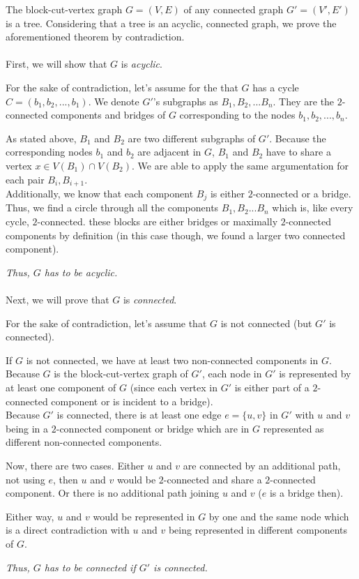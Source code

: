 \documentclass[a4paper]{article}
\begin{document}
	\begin{solution}{15}
	\begin{theorem}{The block-cut-vertex graph $G=(V,E)$ of any connected graph $G'=(V',E')$ is a tree.}
		Considering that a tree is an acyclic, connected graph, we prove the aforementioned theorem by contradiction.\\		
		\ \\
		First, we will show that $G$ is \emph{acyclic}.

		For the sake of contradiction, let's assume for the that $G$ has a cycle $C=(b_1, b_2, ..., b_1)$. We denote $G'$'s subgraphs as $B_1,B_2,...B_n$. They are the $2$-connected components and bridges of $G$ corresponding to the nodes $b_1, b_2,..., b_n$. 

		As stated above, $B_1$ and $B_2$ are two different subgraphs of $G'$. 
		Because the corresponding nodes $b_1$ and $b_2$ are adjacent in $G$, $B_1$ and $B_2$ have to share a vertex $x \in V(B_1) \cap V(B_2)$. We are able to apply the same argumentation for each pair $B_i, B_{i+1}$.\\

		Additionally, we know that each component $B_j$ is either $2$-connected or a bridge. 
		Thus, we find a circle through all the components $B_1, B_2...B_n$ which is, like every cycle, $2$-connected.
 these blocks are either bridges or maximally $2$-connected components by definition (in this case though, we found a larger two connected component).

		\emph{Thus, $G$ has to be acyclic.}\\
		\ \\
		Next, we will prove that $G$ is \emph{connected}.

		For the sake of contradiction, let's assume that $G$ is not connected (but $G'$ is connected). 

		If $G$ is not connected, we have at least two non-connected components in $G$. Because $G$ is the block-cut-vertex graph of $G'$, each node in $G'$ is represented by at least one component of $G$ (since each vertex in $G'$ is either part of a $2$-connected component or is incident to a bridge).\\
 
		Because $G'$ is connected, there is at least one edge $e=\{u, v\}$ in $G'$ with $u$ and $v$ being in a $2$-connected component or bridge which are in $G$ represented as different non-connected components. 

		Now, there are two cases. Either $u$ and $v$ are connected by an additional path, not using $e$, then $u$ and $v$ would be $2$-connected and share a $2$-connected component. Or there is no additional path joining $u$ and $v$ ($e$ is a bridge then). 

		Either way, $u$ and $v$ would be represented in $G$ by one and the same node which is a direct contradiction with $u$ and $v$ being represented in different components of $G$.

		\emph{Thus, $G$ has to be connected if $G'$ is connected.}
	\end{theorem}
	\end{solution}
	
\end{document}
